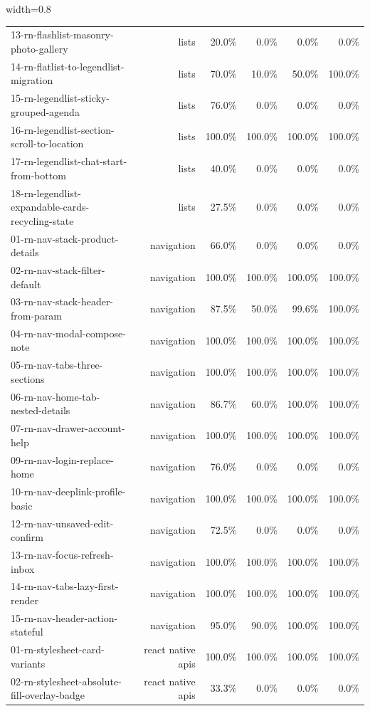 \begin{table}[htbp]
\begin{adjustbox}{width=0.8\textwidth}
\begin{tabular}{lrrrrr}
13-rn-flashlist-masonry-photo-gallery & lists & 20.0\% & 0.0\% & 0.0\% & 0.0\% \\
14-rn-flatlist-to-legendlist-migration & lists & 70.0\% & 10.0\% & 50.0\% & 100.0\% \\
15-rn-legendlist-sticky-grouped-agenda & lists & 76.0\% & 0.0\% & 0.0\% & 0.0\% \\
16-rn-legendlist-section-scroll-to-location & lists & 100.0\% & 100.0\% & 100.0\% & 100.0\% \\
17-rn-legendlist-chat-start-from-bottom & lists & 40.0\% & 0.0\% & 0.0\% & 0.0\% \\
18-rn-legendlist-expandable-cards-recycling-state & lists & 27.5\% & 0.0\% & 0.0\% & 0.0\% \\
01-rn-nav-stack-product-details & navigation & 66.0\% & 0.0\% & 0.0\% & 0.0\% \\
02-rn-nav-stack-filter-default & navigation & 100.0\% & 100.0\% & 100.0\% & 100.0\% \\
03-rn-nav-stack-header-from-param & navigation & 87.5\% & 50.0\% & 99.6\% & 100.0\% \\
04-rn-nav-modal-compose-note & navigation & 100.0\% & 100.0\% & 100.0\% & 100.0\% \\
05-rn-nav-tabs-three-sections & navigation & 100.0\% & 100.0\% & 100.0\% & 100.0\% \\
06-rn-nav-home-tab-nested-details & navigation & 86.7\% & 60.0\% & 100.0\% & 100.0\% \\
07-rn-nav-drawer-account-help & navigation & 100.0\% & 100.0\% & 100.0\% & 100.0\% \\
09-rn-nav-login-replace-home & navigation & 76.0\% & 0.0\% & 0.0\% & 0.0\% \\
10-rn-nav-deeplink-profile-basic & navigation & 100.0\% & 100.0\% & 100.0\% & 100.0\% \\
12-rn-nav-unsaved-edit-confirm & navigation & 72.5\% & 0.0\% & 0.0\% & 0.0\% \\
13-rn-nav-focus-refresh-inbox & navigation & 100.0\% & 100.0\% & 100.0\% & 100.0\% \\
14-rn-nav-tabs-lazy-first-render & navigation & 100.0\% & 100.0\% & 100.0\% & 100.0\% \\
15-rn-nav-header-action-stateful & navigation & 95.0\% & 90.0\% & 100.0\% & 100.0\% \\
01-rn-stylesheet-card-variants & react native apis & 100.0\% & 100.0\% & 100.0\% & 100.0\% \\
02-rn-stylesheet-absolute-fill-overlay-badge & react native apis & 33.3\% & 0.0\% & 0.0\% & 0.0\% \\

\end{tabular}
\end{adjustbox}
\end{table}
